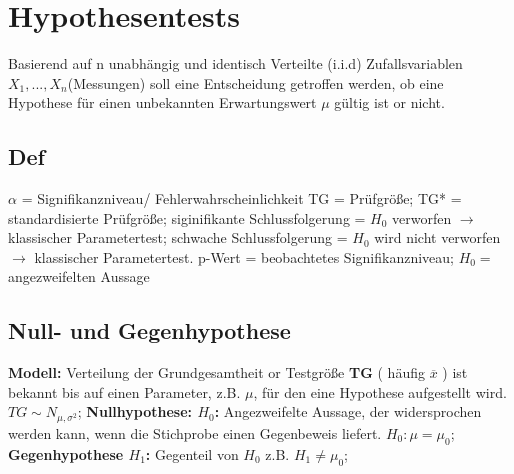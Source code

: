 \section{Hypothesentests}
Basierend auf n unabhängig und identisch Verteilte (i.i.d) Zufallsvariablen $ X_{1}, ..., X_{n} $(Messungen) soll eine Entscheidung getroffen werden, ob eine Hypothese für einen unbekannten Erwartungswert $ \mu $ gültig ist or nicht.
\subsection{Def}
$\alpha $ = Signifikanzniveau/ Fehlerwahrscheinlichkeit 
TG = Prüfgröße; 
TG* = standardisierte Prüfgröße; 
siginifikante Schlussfolgerung = $ H_{0} $ verworfen $\rightarrow$ klassischer Parametertest; 
schwache Schlussfolgerung = $ H_{0} $ wird nicht verworfen $\rightarrow$ klassischer Parametertest.
p-Wert = beobachtetes Signifikanzniveau; $ H_{0} = $ angezweifelten Aussage
\subsection{Null- und Gegenhypothese}
\textbf{Modell:} Verteilung der Grundgesamtheit or Testgröße \textbf{TG} ( häufig $\overline{x}$ ) ist bekannt bis auf einen Parameter, z.B. $ \mu $, für den eine Hypothese aufgestellt wird.
$ TG \sim  N_{\mu, \sigma^2}$; 
\textbf{Nullhypothese: $ H_{0}$:} Angezweifelte Aussage, der widersprochen werden kann, wenn die Stichprobe einen Gegenbeweis liefert. $ H_{0}: \mu = \mu_{0}$; 
\textbf{Gegenhypothese $ H_{1} $:} Gegenteil von $ H_{0} $ z.B. $ H_{1} \neq \mu_{0} $;

